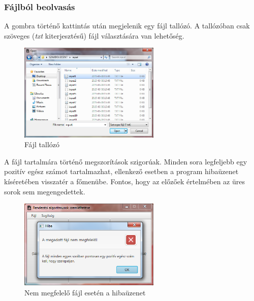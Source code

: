 \documentclass{elteikthesis}
\begin{document}
\subsubsection{Fájlból beolvasás}
A gombra történő kattintás után megjelenik egy fájl tallózó. A tallózóban csak szöveges (\emph{txt} kiterjesztésű) fájl választására van lehetőség.
\begin{figure}[H]
	\centering
	\includegraphics[width=0.6\textwidth]{pics/fileinput.png}
	\caption{Fájl tallózó}
\end{figure}
 A fájl tartalmára történő megszorítások szigorúak. Minden sora legfeljebb egy pozitív egész számot tartalmazhat, ellenkező esetben a program hibaüzenet kíséretében visszatér a főmenübe. Fontos, hogy az előzőek értelmében az üres sorok sem megengedettek.
 \begin{figure}[H]
 	\centering
 	\includegraphics[width=0.6\textwidth]{pics/fileinput_error.png}
 	\caption{Nem megfelelő fájl esetén a hibaüzenet}
 \end{figure}
\end{document}
